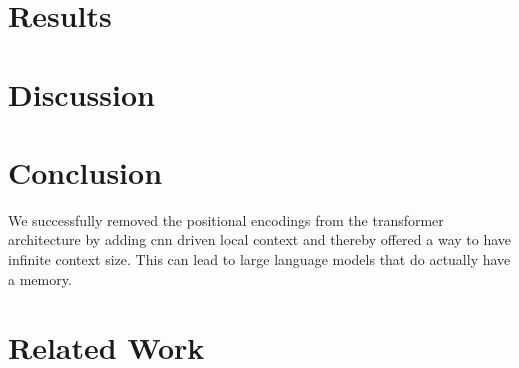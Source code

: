 \documentclass[11pt]{article}
\begin{document}
\section{Results}



\section{Discussion}

\section{Conclusion}

We successfully removed the positional encodings from the transformer architecture by adding cnn driven local context and thereby 
offered a way to have infinite context size. This can lead to large language models that do actually have a memory. 




\section{Related Work}
\end{document}
